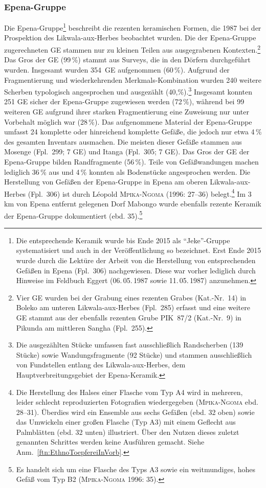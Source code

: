 \subsubsection{Epena-Gruppe}\label{sec:EPE-Gr}

Die Epena-Gruppe\footnote{Die entsprechende Keramik wurde bis Ende 2015 als \enquote{Jeke}-Gruppe systematisiert und auch in der Veröffentlichung \textcite[119 Fig. 6-3, 123]{Seidensticker.2016b} so bezeichnet. Erst Ende 2015 wurde durch die Lektüre der Arbeit von \textcite[27--36]{MpikaNgoma.1996} die Herstellung von entsprechenden Gefäßen in Epena (Fpl.~306) nachgewiesen. Diese war vorher lediglich durch Hinweise im Feldbuch Eggert (06.\,05.\,1987 sowie 11.\,05.\,1987) anzunehmen.} beschreibt die rezenten keramischen Formen, die 1987 bei der Prospektion des \mbox{Likwala}-\mbox{aux}-\mbox{Herbes} beobachtet wurden. Die der Epena-Gruppe zugerechneten GE stammen nur zu kleinen Teilen aus ausgegrabenen Kontexten.\footnote{Vier GE wurden bei der Grabung eines rezenten Grabes (Kat.-Nr.~14) in Boleko am unteren \mbox{Likwala}-\mbox{aux}-\mbox{Herbes} (Fpl.~285) erfasst und eine weitere GE stammt aus der ebenfalls rezenten Grube PIK~87/2 (Kat.-Nr.~9) in Pikunda am mittleren \mbox{Sangha} (Fpl.~255).} Das Gros der GE (99\,\%) stammt aus Surveys, die in den Dörfern durchgeführt wurden. Insgesamt wurden 354~GE aufgenommen (60\,\%). Aufgrund der Fragmentierung und wiederkehrenden Merkmals-Kombination wurden 240 weitere Scherben typologisch angesprochen und ausgezählt (40,\%).\footnote{Die ausgezählten Stücke umfassen fast ausschließlich Randscherben (139 Stücke) sowie Wandungsfragmente (92 Stücke) und stammen ausschließlich von Fundstellen entlang des Likwala-aux-Herbes, dem Hauptverbreitungsgebiet der Epena-Keramik.} Insgesamt konnten 251 GE sicher der Epena-Gruppe zugewiesen werden (72\,\%), während bei 99 weiteren GE aufgrund ihrer starken Fragmentierung eine Zuweisung nur unter Vorbehalt möglich war (28\,\%). Das aufgenommene Material der Epena-Gruppe umfasst 24 komplette oder hinreichend komplette Gefäße, die jedoch nur etwa 4\,\% des gesamten Inventars ausmachen. Die meisten dieser Gefäße stammen aus Mosenge (Fpl.~299; 7 GE) und Itanga (Fpl.~305; 7 GE). Das Gros der GE der Epena-Gruppe bilden Randfragmente (56\,\%). Teile von Gefäßwandungen machen lediglich 36\,\% aus und 4\,\% konnten als Bodenstücke angesprochen werden. Die Herstellung von Gefäßen der Epena-Gruppe in Epena am oberen \mbox{Likwala}-\mbox{aux}-\mbox{Herbes} (Fpl.~306) ist durch Léopold \textsc{Mpika-Ngoma} (1996: 27--36) belegt.\footnote{Die Herstellung des Halses einer Flasche vom Typ A4 wird in mehreren, leider schlecht reproduzierten Fotografien wiedergegeben (\textsc{Mpika-Ngoma} ebd. 28--31). Überdies wird ein Ensemble aus sechs Gefäßen (ebd. 32 oben) sowie das Umwickeln einer großen Flasche (Typ A3) mit einem Geflecht aus Palmblätten (ebd. 32 unten) illustriert. Über den Nutzen dieses zuletzt genannten Schrittes werden keine Ausführen gemacht. Siehe Anm.~\ref{ftn:EthnoToepfereiInVorb}.} Im 3\,km von Epena entfernt gelegenen Dorf Mabongo wurde ebenfalls rezente Keramik der Epena-Gruppe dokumentiert (ebd. 35).\footnote{Es handelt sich um eine Flasche des Typs A3 sowie ein weitmundiges, hohes Gefäß vom Typ B2 (\textsc{Mpika-Ngoma} 1996: 35).}

